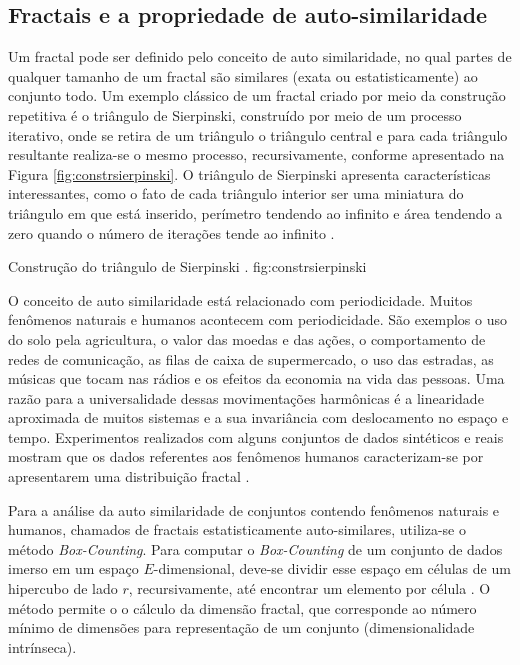 \subsection{Fractais e a propriedade de auto-similaridade}
	\label{subsec:fractais}

Um fractal pode ser definido pelo conceito de auto similaridade, no qual partes
de qualquer tamanho de um fractal são similares (exata ou estatisticamente) ao
conjunto todo. Um exemplo clássico de um fractal criado por meio da construção
repetitiva é o triângulo de Sierpinski, construído por meio de um processo
iterativo, onde se retira de um triângulo o triângulo central e para cada
triângulo resultante realiza-se o mesmo processo, recursivamente, conforme
apresentado na Figura \ref{fig:constrsierpinski}. O triângulo de Sierpinski
apresenta características interessantes, como o fato de cada triângulo interior
ser uma miniatura do triângulo em que está inserido, perímetro tendendo ao
infinito e área tendendo a zero quando o número de iterações tende ao infinito
\cite{Schroeder91,Mandelbrot1982}. 

{Construção do triângulo de Sierpinski \cite{Schroeder91}.}
{fig:constrsierpinski}

O conceito de auto similaridade está relacionado com periodicidade. Muitos
fenômenos naturais e humanos acontecem com periodicidade. São exemplos o uso do
solo pela agricultura, o valor das moedas e das ações, o comportamento de redes
de comunicação, as filas de caixa de supermercado, o uso das estradas, as
músicas que tocam nas rádios e os efeitos da economia na vida das pessoas. Uma
razão para a universalidade dessas movimentações harmônicas é a linearidade
aproximada de muitos sistemas e a sua invariância com deslocamento no espaço e
tempo. Experimentos realizados com alguns conjuntos de dados sintéticos e reais
mostram que os dados referentes aos fenômenos humanos caracterizam-se por
apresentarem uma distribuição fractal \cite{Traina2010}.

Para a análise da auto similaridade de conjuntos contendo fenômenos naturais e
humanos, chamados de fractais estatisticamente auto-similares, utiliza-se o
método \textit{Box-Counting}. Para computar o \textit{Box-Counting} de um
conjunto de dados imerso em um espaço $E$-dimensional, deve-se dividir esse
espaço em células de um hipercubo de lado $r$, recursivamente, até encontrar um
elemento por célula \cite{Traina2010}. O método permite o o cálculo da dimensão fractal, que corresponde ao número mínimo de dimensões para representação de um conjunto (dimensionalidade intrínseca).

